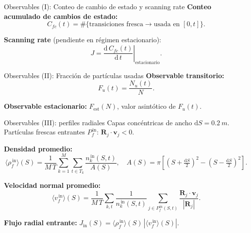 \documentclass[10pt,aspectratio=169]{beamer}
\newcommand{\vect}[1]{\mathbf{#1}}
\begin{document}
    \begin{frame}{Observables (I): Conteo de cambio de estado y scanning rate}
        \textbf{Conteo acumulado de cambios de estado:}
        \[
            C_{fc}(t) = \#\{\text{transiciones fresca}\to\text{usada en }[0,t]\}.
        \]

        \textbf{Scanning rate} (pendiente en régimen estacionario):
        \[
            J = \left.\frac{\mathrm{d}\,C_{fc}(t)}{\mathrm{d}\,t}\right|_{\text{estacionario}}.
        \]
    \end{frame}

    \begin{frame}{Observables (II): Fracción de partículas usadas}
        \textbf{Observable transitorio:}
        \[
            F_u(t) = \frac{N_u(t)}{N}.
        \]

        \textbf{Observable estacionario:} $F_{\text{est}}(N)$, valor asintótico de $F_u(t)$.
    \end{frame}

    \begin{frame}{Observables (III): perfiles radiales}
        Capas concéntricas de ancho $\mathrm{d}S = \SI{0.2}{m}$.
        Partículas frescas entrantes $P_f^{\,\text{in}}$: $\vect{R}_j\cdot\vect{v}_j < 0$.

        \vspace{0.15cm}
        \textbf{Densidad promedio:}
        \[
            \langle\rho_f^{\,\text{in}}\rangle(S) =
            \frac{1}{M\,T}\sum_{k=1}^{M}\sum_{t\in T_k}
            \frac{n_k^{\,\text{in}}(S,t)}{A(S)},
            \quad A(S) = \pi\!\left[\!\left(S+\tfrac{\mathrm{d}S}{2}\right)^{\!2}-\left(S-\tfrac{\mathrm{d}S}{2}\right)^{\!2}\right].
        \]

        \textbf{Velocidad normal promedio:}
        \[
            \langle v_f^{\,\text{in}}\rangle(S) =
            \frac{1}{M\,T}\sum_{k,t} \frac{1}{n_k^{\,\text{in}}(S,t)}
            \sum_{j\in P_f^{\,\text{in}}(S,t)} \frac{\vect{R}_j\cdot\vect{v}_j}{|\vect{R}_j|}.
        \]

        \textbf{Flujo radial entrante:}
        $J_{\text{in}}(S) = \langle\rho_f^{\,\text{in}}\rangle(S)\,|\langle v_f^{\,\text{in}}\rangle(S)|$.
    \end{frame}
\end{document}
